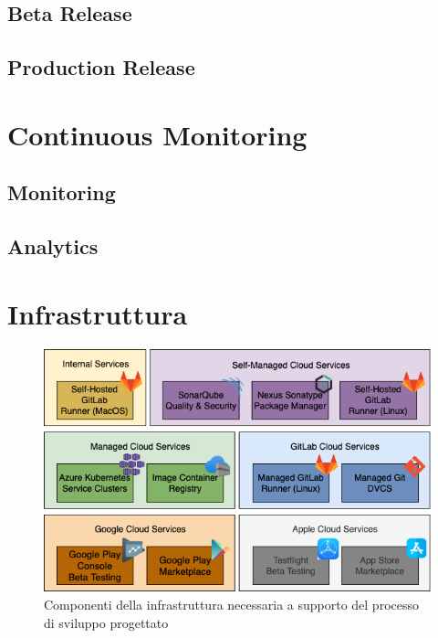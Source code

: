 \subsection{Beta Release}

\subsection{Production Release}

\section{Continuous Monitoring}
\subsection{Monitoring}
\subsection{Analytics}

\section{Infrastruttura}
\begin{figure}[H]
\centering
\includegraphics[width=1\textwidth]{img/tesi-3-infra.drawio.png}
\caption{Componenti della infrastruttura necessaria a supporto del processo di sviluppo progettato}
\end{figure}

